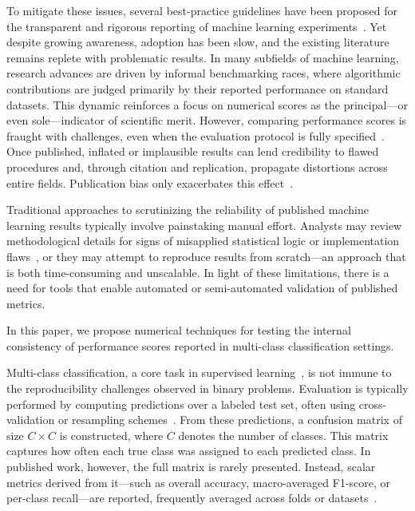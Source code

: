 \documentclass[3p, times]{elsarticle}
\begin{document}
To mitigate these issues, several best-practice guidelines have been proposed for the transparent and rigorous reporting of machine learning experiments~\cite{repr0, repr2}. Yet despite growing awareness, adoption has been slow, and the existing literature remains replete with problematic results. In many subfields of machine learning, research advances are driven by informal benchmarking races, where algorithmic contributions are judged primarily by their reported performance on standard datasets. This dynamic reinforces a focus on numerical scores as the principal---or even sole---indicator of scientific merit. However, comparing performance scores is fraught with challenges, even when the evaluation protocol is fully specified~\cite{ranking}. Once published, inflated or implausible results can lend credibility to flawed procedures and, through citation and replication, propagate distortions across entire fields. Publication bias only exacerbates this effect~\cite{publicationbias}.

Traditional approaches to scrutinizing the reliability of published machine learning results typically involve painstaking manual effort. Analysts may review methodological details for signs of misapplied statistical logic or implementation flaws~\cite{psychiatry, csecurity, satellite}, or they may attempt to reproduce results from scratch---an approach that is both time-consuming and unscalable. In light of these limitations, there is a need for tools that enable automated or semi-automated validation of published metrics.

In this paper, we propose numerical techniques for testing the internal consistency of performance scores reported in multi-class classification settings.

Multi-class classification, a core task in supervised learning~\cite{mlbook}, is not immune to the reproducibility challenges observed in binary problems. Evaluation is typically performed by computing predictions over a labeled test set, often using cross-validation or resampling schemes~\cite{cv1}. From these predictions, a confusion matrix of size $C \times C$ is constructed, where $C$ denotes the number of classes. This matrix captures how often each true class was assigned to each predicted class. In published work, however, the full matrix is rarely presented. Instead, scalar metrics derived from it---such as overall accuracy, macro-averaged F1-score, or per-class recall---are reported, frequently averaged across folds or datasets~\cite{scores}.
\end{document}
